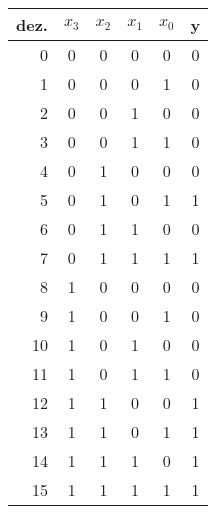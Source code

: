 \documentclass[10pt,a4paper,oneside,ngerman,numbers=noenddot]{scrartcl}
\begin{document}
\subsection{} %
\begin{tabular}{r|ccccc}
dez.& $x_{3}$	& $x_{2}$	& $x_{1}$	& $x_{0}$	& y \\
\hline
0	& 0 		& 0			& 0			& 0		  	& 0 \\
1	& 0			& 0			& 0			& 1		  	& 0 \\
2	& 0			& 0			& 1			& 0			& 0 \\
3	& 0			& 0			& 1			& 1			& 0 \\
4	& 0			& 1			& 0			& 0			& 0 \\
5	& 0			& 1			& 0 		& 1			& 1 \\
6	& 0			& 1			& 1			& 0			& 0 \\
7	& 0			& 1			& 1			& 1			& 1 \\
8	& 1			& 0			& 0			& 0			& 0 \\
9	& 1			& 0			& 0			& 1			& 0 \\
10	& 1			& 0			& 1			& 0			& 0 \\
11	& 1			& 0			& 1 		& 1			& 0 \\
12	& 1			& 1			& 0			& 0			& 1 \\
13 	& 1			& 1			& 0			& 1			& 1 \\
14	& 1			& 1			& 1			& 0			& 1 \\
15	& 1			& 1			& 1			& 1			& 1
\end{tabular}
\end{document}
